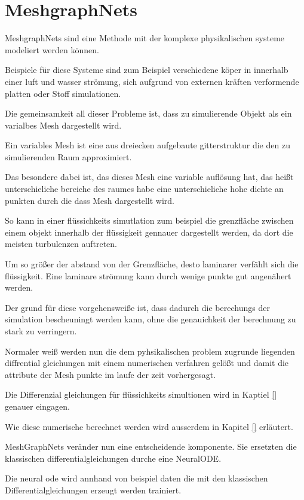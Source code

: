 

\section{MeshgraphNets} \label{sec:meshgraphnets}

MeshgraphNets sind eine Methode mit der komplexe physikalischen systeme modeliert werden können.

Beispiele für diese Systeme sind zum Beispiel verschiedene köper in innerhalb einer luft und wasser strömung, 
sich aufgrund von externen kräften verformende platten oder Stoff simulationen.


Die gemeinsamkeit all dieser Probleme ist, dass zu simulierende Objekt als ein varialbes Mesh dargestellt wird.

Ein variables Mesh ist eine aus dreiecken aufgebaute gitterstruktur die den zu simulierenden Raum approximiert.

Das besondere dabei ist, das dieses Mesh eine variable auflösung hat, das heißt unterschieliche bereiche des raumes 
habe eine unterschieliche hohe dichte an punkten durch die dass Mesh dargestellt wird.

So kann in einer flüssichkeits simutlation zum beispiel die grenzfläche zwischen einem objekt innerhalb der flüssigkeit
gennauer dargestellt werden, da dort die meisten turbulenzen auftreten.

Um so größer der abstand von der Grenzfläche, desto laminarer verfählt sich die flüssigkeit.
Eine laminare strömung kann durch wenige punkte gut angenähert werden.

Der grund für diese vorgehensweiße ist, dass dadurch die berechungs der simulation bescheuningt werden kann,
ohne die genauichkeit der berechnung zu stark zu verringern.

Normaler weiß werden nun die dem pyhsikalischen problem zugrunde liegenden diffrential gleichungen mit einem numerischen verfahren gelößt und damit die attribute der Mesh punkte im laufe der zeit vorhergesagt.

Die Differenzial gleichungen für flüssichkeits simultionen wird in Kaptiel \ref{} genauer eingagen.

Wie diese numerische berechnet werden wird ausserdem in Kapitel \ref{} erläutert.

MeshGraphNets veränder nun eine entscheidende komponente.
Sie ersetzten die klassischen differentialgleichungen durche eine NeuralODE.

Die neural ode wird annhand von beispiel daten die mit den klassischen Differentialgleichungen erzeugt werden trainiert.

